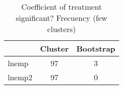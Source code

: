 \begin{table}[htbp]\centering
\caption{Coefficient of treatment significant? Frecuency (few clusters)}
\begin{tabular}{l*{2}{c}}
\toprule
            &     Cluster&   Bootstrap\\
\midrule
lnemp       &          97&           3\\
lnemp2      &          97&           0\\
\bottomrule
\end{tabular}
\end{table}
